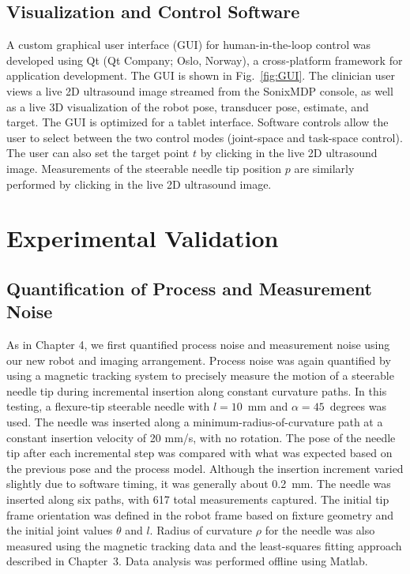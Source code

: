 \subsection{Visualization and Control Software}
A custom graphical user interface (GUI) for human-in-the-loop control was developed using Qt (Qt Company; Oslo, Norway), a cross-platform framework for application development. The GUI is shown in Fig.~\ref{fig:GUI}. The clinician user views a live 2D ultrasound image streamed from the SonixMDP console, as well as a live 3D visualization of the robot pose, transducer pose, estimate, and target. The GUI is optimized for a tablet interface. Software controls allow the user to select between the two control modes (joint-space and task-space control). The user can also set the target point $t$ by clicking in the live 2D ultrasound image. Measurements of the steerable needle tip position $p$ are similarly performed by clicking in the live 2D ultrasound image. 


\section{Experimental Validation}
\label{sec:HumanInTheLoopValidation}
\subsection{Quantification of Process and Measurement Noise}
As in Chapter 4, we first quantified process noise and measurement noise using our new robot and imaging arrangement. Process noise was again quantified by using a magnetic tracking system to precisely measure the motion of a steerable needle tip during incremental insertion along constant curvature paths. In this testing, a flexure-tip steerable needle with $l = 10$~mm and $\alpha = 45$~degrees was used. The needle was inserted along a minimum-radius-of-curvature path at a constant insertion velocity of 20 mm/s, with no rotation. The pose of the needle tip after each incremental step was compared with what was expected based on the previous pose and the process model. Although the insertion increment varied slightly due to software timing, it was generally about 0.2~mm. The needle was inserted along six paths, with 617 total measurements captured. The initial tip frame orientation was defined in the robot frame based on fixture geometry and the initial joint values $\theta$ and $l$. Radius of curvature $\rho$ for the needle was also measured using the magnetic tracking data and the least-squares fitting approach described in Chapter~3. Data analysis was performed offline using Matlab. 


